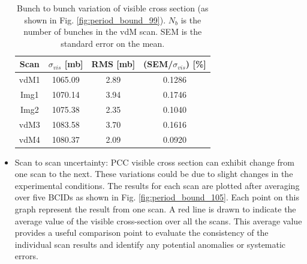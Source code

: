 \begin{itemize}

\begin{table}[!htp]
  \centering
  \caption[Bunch uncertainty]{Bunch to bunch variation of visible cross section (as shown in Fig. \ref{fig:period_bound_99}). $N_b$ is the number of bunches in the vdM scan. SEM is the standard error on the mean.}
\begin{tabular}{cccc}
\textbf{Scan} & \textbf{$\sigma_{vis}$ [mb]} & \textbf{RMS [mb]} & (SEM/$\sigma_{vis}$) [\%] \\
\hline
vdM1 & 1065.09 & 2.89 & 0.1286 \\
Img1 & 1070.14 & 3.94 & 0.1746 \\
Img2 & 1075.38 & 2.35 & 0.1040 \\
vdM3 & 1083.58 & 3.70 & 0.1616 \\
vdM4 & 1080.37 & 2.09 & 0.0920 \\
\end{tabular}
\label{tab:my_labeltt}
\end{table}


\newpage
\item Scan to scan uncertainty: PCC visible cross section can exhibit change from one scan to the next. These variations could be due to slight changes in the experimental conditions. The results for each scan are plotted after averaging over five BCIDs as shown in Fig. \ref{fig:period_bound_105}. Each point on this graph represent the result from one scan. A red line is drawn to indicate the average value of the visible cross-section over all the scans. This average value provides a useful comparison point to evaluate the consistency of the individual scan results and identify any potential anomalies or systematic errors.


\end{itemize}
